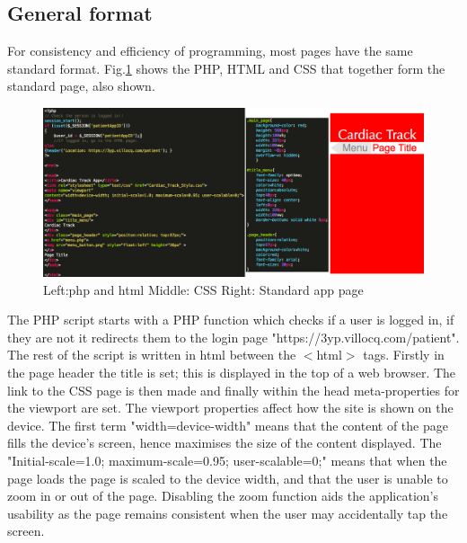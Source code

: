 \documentclass[11pt]{article}
\begin{document}
\subsection{General format}
For consistency and efficiency of programming, most pages have the same standard format. Fig.\ref{appstandard} shows the PHP, HTML and CSS that together form the standard page, also shown.
\begin{figure}[h!] 
\includegraphics[width=\linewidth]{appstandard.png}
\caption{Left:php and html Middle: CSS Right: Standard app page \label{appstandard}}
\end{figure} 
The PHP script starts with a PHP function which checks if a user is logged in, if they are not it redirects them to the login page "https://3yp.villocq.com/patient". 
\\ \indent
The rest of the script is written in html between the $<$html$>$ tags. Firstly in the page header the title is set; this is displayed in the top of a web browser. The link to the CSS page is then made and finally within the head meta-properties for the viewport are set. The viewport properties affect how the site is shown on the device. The first term "width=device-width" means that the content of the page fills the device's screen, hence maximises the size of the content displayed. The "Initial-scale=1.0; maximum-scale=0.95; user-scalable=0;" means that when the page loads the page is scaled to the device width, and that the user is unable to zoom in or out of the page. Disabling the zoom function aids the application's usability as the page remains consistent when the user may accidentally tap the screen. 
\\ \indent
\end{document}
